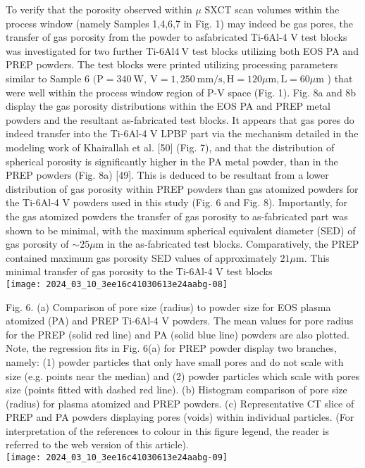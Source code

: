 \documentclass[10pt]{article}
\begin{document}
To verify that the porosity observed within $\mu$ SXCT scan volumes within the process window (namely Samples 1,4,6,7 in Fig. 1) may indeed be gas pores, the transfer of gas porosity from the powder to asfabricated Ti-6Al-4 V test blocks was investigated for two further Ti-6Al$4 \mathrm{~V}$ test blocks utilizing both EOS PA and PREP powders. The test blocks were printed utilizing processing parameters similar to Sample 6 $(\mathrm{P}=340 \mathrm{~W}, \mathrm{~V}=1,250 \mathrm{~mm} / \mathrm{s}, \mathrm{H}=120 \mu \mathrm{m}, \mathrm{L}=60 \mu \mathrm{m}$ ) that were well within the process window region of P-V space (Fig. 1). Fig. 8a and 8b display the gas porosity distributions within the EOS PA and PREP metal powders and the resultant as-fabricated test blocks. It appears that gas pores do indeed transfer into the Ti-6Al-4 V LPBF part via the mechanism detailed in the modeling work of Khairallah et al. [50] (Fig. 7), and that the distribution of spherical porosity is significantly higher in the PA metal powder, than in the PREP powders (Fig. 8a) [49]. This is deduced to be resultant from a lower distribution of gas porosity within PREP powders than gas atomized powders for the Ti-6Al-4 $\mathrm{V}$ powders used in this study (Fig. 6 and Fig. 8). Importantly, for the gas atomized powders the transfer of gas porosity to as-fabricated part was shown to be minimal, with the maximum spherical equivalent diameter (SED) of gas porosity of $\sim 25 \mu \mathrm{m}$ in the as-fabricated test blocks. Comparatively, the PREP contained maximum gas porosity SED values of approximately $21 \mu \mathrm{m}$. This minimal transfer of gas porosity to the Ti-6Al-4 V test blocks\\
\texttt{[image: 2024\_03\_10\_3ee16c41030613e24aabg-08]}

Fig. 6. (a) Comparison of pore size (radius) to powder size for EOS plasma atomized (PA) and PREP Ti-6Al-4 V powders. The mean values for pore radius for the PREP (solid red line) and PA (solid blue line) powders are also plotted. Note, the regression fits in Fig. 6(a) for PREP powder display two branches, namely: (1) powder particles that only have small pores and do not scale with size (e.g. points near the median) and (2) powder particles which scale with pores size (points fitted with dashed red line). (b) Histogram comparison of pore size (radius) for plasma atomized and PREP powders. (c) Representative CT slice of PREP and PA powders displaying pores (voids) within individual particles. (For interpretation of the references to colour in this figure legend, the reader is referred to the web version of this article).\\
\texttt{[image: 2024\_03\_10\_3ee16c41030613e24aabg-09]}
\end{document}
